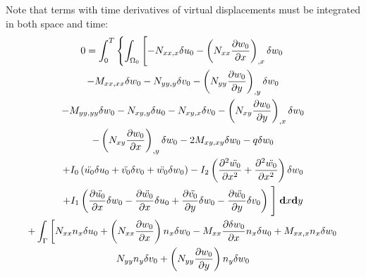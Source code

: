 \documentclass[11pt,letterpaper,titlepage,draft]{article}
\newcommand{\diff}{\textbf d}
\newcommand{\PDer}[2]{\frac{\partial #1}{\partial #2}}
\newcommand{\PPDer}[2]{\frac{\partial^2 #1}{\partial #2^2}}
\newcommand{\Vartn}[1]{\delta #1}
\numberwithin{equation}{subsection}
\begin{document}
Note that terms with time derivatives of virtual displacements must be integrated in both space and time:
\begin{multline}\label{E:S1001:SS102:16}
        0=\int_0^T\left\{\int_{\Omega_0} \left[ 
                                               - N_{xx,x} \Vartn{u_0} 
                                               - \left(N_{xx}\PDer{w_0}{x}\right)_{,x} \Vartn{w_0} 
\right. \right.\\
                                               - M_{xx,xx}\Vartn{w_0}
                                               - N_{yy,y} \Vartn{v_0} 
                                               - \left(N_{yy}\PDer{w_0}{y}\right)_{,y} \Vartn{w_0} 
\\
                                               - M_{yy,yy}\Vartn{w_0}
                                               - N_{xy,y} \Vartn{u_0} 
                                               - N_{xy,x} \Vartn{v_0} 
                                               - \left(N_{xy}\PDer{w_0}{y}\right)_{,x} \Vartn{w_0} 
\\
                                               - \left(N_{xy}\PDer{w_0}{x}\right)_{,y} \Vartn{w_0} 
                                               -2 M_{xy,xy}\Vartn{w_0} - q\Vartn{w_0}
\\
                                               +I_0\left(\ddot{u_0}\Vartn{u_0} + \ddot{v_0}\Vartn{v_0} + \ddot{w_0}\Vartn{w_0}\right)
                                               -I_2\left(\PPDer{\ddot{w_0}}{x} + \PPDer{\ddot{w_0}}{x} \right) \Vartn{w_0} 
\\
                                               +I_1\left(\PDer{\ddot{u_0}}{x}\Vartn{w_0} - \PDer{\ddot{w_0}}{x}\Vartn{u_0} + \PDer{\ddot{v_0}}{y}\Vartn{w_0}  - \PDer{\ddot{w_0}}{y}\Vartn{v_0} \right)
\left.\Biggr]\right.\diff{x} \diff{y}
\\
+ \int_{\Gamma} \left[
                                                 N_{xx}n_x\Vartn{u_0}
                                               + \left( N_{xx} \PDer{w_0}{x} \right) n_x\Vartn{w_0}
                                               - M_{xx}\PDer{\Vartn{w_0}}{x}n_x\Vartn{u_0}
                                               + M_{xx,x}n_x\Vartn{w_0}
\right.\\
                                                 N_{yy}n_y\Vartn{v_0}
                                               + \left( N_{yy} \PDer{w_0}{y} \right) n_y\Vartn{w_0}

\end{multline}
\end{document}
